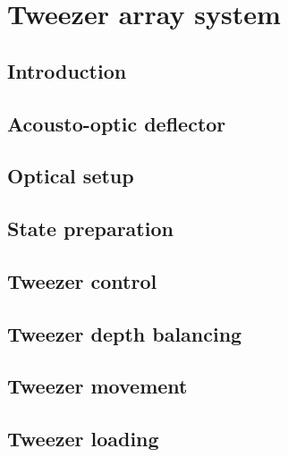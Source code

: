 \documentclass[twoside]{article}
\begin{document}
\newpage
\section{Tweezer array system} \label{sec:tweezer}

\subsection{Introduction} \label{subsec:state-prepation-overview}


\subsection{Acousto-optic deflector} \label{subsec:aodconcept}

\subsection{Optical setup}

\subsection{State preparation} \label{subsec:state-prepation}

\subsection{Tweezer control} \label{subsec:control}


\subsection{Tweezer depth balancing} \label{subsec:balancing}


\subsection{Tweezer movement} \label{subsec:tweezer-movement}


\subsection{Tweezer loading} \label{subsec:tweezer-loading}

\end{document}

